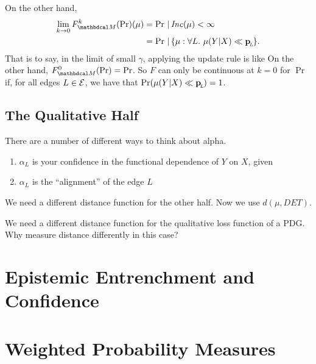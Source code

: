 \documentclass{article}
\begin{document}
On the other hand,
\begin{align*}
    \lim_{k \to 0} F_{\dg M}^k(\Pr)(\mu) &= \Pr \,|\, \Inc(\mu) < \infty \\
        &= \Pr \,|\, \{\mu : \forall L.~\mu(Y|X) \ll \bp \}.
\end{align*}
That is to say, in the limit of small $\gamma$, applying the update rule is like
On the other hand, $F_{\dg M}^0(\Pr) = \Pr$. So $F$ can only be continuous at $k=0$ for $\Pr$ if, for all edges $L \in \mathcal E$, we have that $\Pr(\mu(Y|X) \ll \mathbf{p}_{\!_{L}\!}) = 1$.




\subsection{The Qualitative Half}


There are a number of different ways to think about alpha.
\begin{enumerate}[nosep]
    \item $\alpha_L$ is your confidence in the functional dependence of $Y$ on $X$, given
    \item $\alpha_L$ is the ``alignment'' of the edge $L$
\end{enumerate}

We need a different distance function for the other half. Now we use
$d(\mu, DET)$.

%

We need a different distance function for the qualitative loss function of a PDG.
Why measure distance differently in this case?


\section{Epistemic Entrenchment and Confidence}
\section{Weighted Probability Measures}
\end{document}
